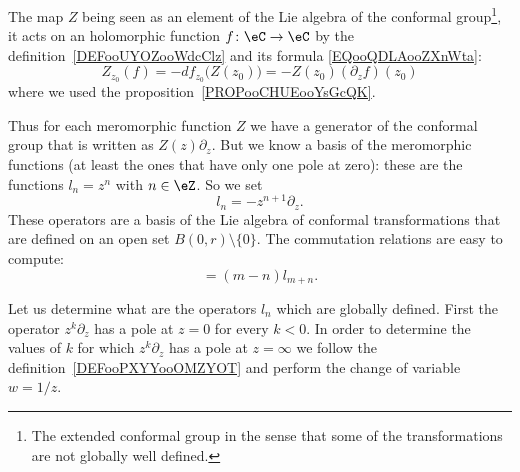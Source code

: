 \begin{normaltext}  \label{NORMooHDLPooQBfEif}
	The map \( Z\) being seen as an element of the Lie algebra of the conformal group\footnote{The extended conformal group in the sense that some of the transformations are not globally well defined.}, it acts on an holomorphic function \( f\colon \eC\to \eC \) by the definition~\ref{DEFooUYOZooWdcClz} and its formula \eqref{EQooQDLAooZXnWta}:
	\begin{equation}
		Z_{z_0}(f)=-df_{z_0}\big( Z(z_0) \big)=-Z(z_0)(\partial_zf)(z_0)
	\end{equation}
	where we used the proposition~\ref{PROPooCHUEooYsGcQK}.
\end{normaltext}

Thus for each meromorphic function \( Z\) we have a generator of the conformal group that is written as \( Z(z)\partial_z\). But we know a basis of the meromorphic functions (at least the ones that have only one pole at zero): these are the functions \( l_n=z^n \) with \( n\in \eZ\). So we set
\begin{equation}
	l_n=-z^{n+1}\partial_z.
\end{equation}
These operators are a basis of the Lie algebra of conformal transformations that are defined on an open set \( B(0,r)\setminus \{ 0 \}\). The commutation relations are easy to compute:
\begin{equation}
	[l_m,l_n]=(m-n)l_{m+n}.
\end{equation}

Let us determine what are the operators \( l_n\) which are globally defined\cite{ooPEEYooCndpvc}. First the operator \( z^k\partial_z\) has a pole at \( z=0\) for every \( k<0\). In order to determine the values of \( k\) for which \( z^k\partial_z\) has a pole at \( z=\infty\) we follow the definition~\ref{DEFooPXYYooOMZYOT} and perform the change of variable \(w=1/z\).

